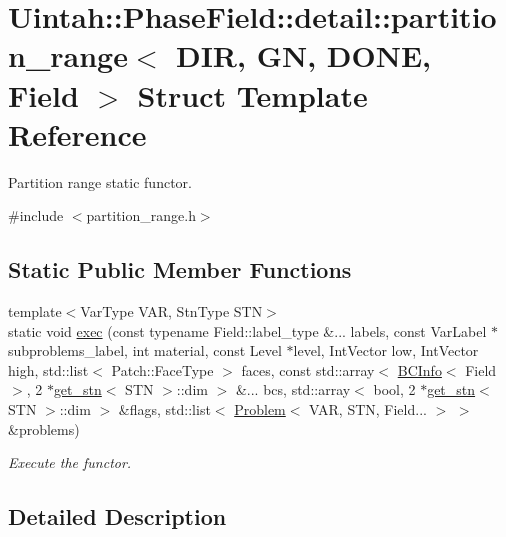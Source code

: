 \hypertarget{structUintah_1_1PhaseField_1_1detail_1_1partition__range}{}\section{Uintah\+:\+:Phase\+Field\+:\+:detail\+:\+:partition\+\_\+range$<$ D\+IR, GN, D\+O\+NE, Field $>$ Struct Template Reference}
\label{structUintah_1_1PhaseField_1_1detail_1_1partition__range}


Partition range static functor.  




{\ttfamily \#include $<$partition\+\_\+range.\+h$>$}

\subsection*{Static Public Member Functions}
\begin{DoxyCompactItemize}
\item 
{\footnotesize template$<$Var\+Type V\+AR, Stn\+Type S\+TN$>$ }\\static void \hyperlink{structUintah_1_1PhaseField_1_1detail_1_1partition__range_a23c5d8d614575b5c5be05418ea87d014}{exec} (const typename Field\+::label\+\_\+type \&... labels, const Var\+Label $\ast$subproblems\+\_\+label, int material, const Level $\ast$level, Int\+Vector low, Int\+Vector high, std\+::list$<$ Patch\+::\+Face\+Type $>$ faces, const std\+::array$<$ \hyperlink{structUintah_1_1PhaseField_1_1BCInfo}{B\+C\+Info}$<$ Field $>$, 2 $\ast$\hyperlink{structUintah_1_1PhaseField_1_1get__stn}{get\+\_\+stn}$<$ S\+TN $>$\+::dim $>$ \&... bcs, std\+::array$<$ bool, 2 $\ast$\hyperlink{structUintah_1_1PhaseField_1_1get__stn}{get\+\_\+stn}$<$ S\+TN $>$\+::dim $>$ \&flags, std\+::list$<$ \hyperlink{classUintah_1_1PhaseField_1_1Problem}{Problem}$<$ V\+AR, S\+TN, Field... $>$ $>$ \&problems)
\begin{DoxyCompactList}\small\item\em Execute the functor. \end{DoxyCompactList}\end{DoxyCompactItemize}


\subsection{Detailed Description}
